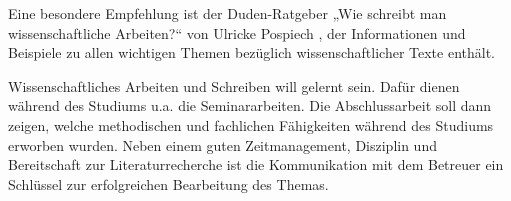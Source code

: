 \documentclass[
    12pt,
    headings=small,
    parskip=half,           %
    bibliography=totoc,
    numbers=noenddot,       %
    open=any,               %
    ]{scrreprt}
\begin{document}
Eine besondere Empfehlung ist der Duden-Ratgeber „Wie schreibt man wissenschaftliche Arbeiten?“ von Ulricke Pospiech \cite{Posp2012}, der Informationen und Beispiele zu allen wichtigen Themen bezüglich wissenschaftlicher Texte enthält.

Wissenschaftliches Arbeiten und Schreiben will gelernt sein. Dafür dienen während des Studiums u.a. die Seminararbeiten. Die Abschlussarbeit soll dann zeigen, welche methodischen und fachlichen Fähigkeiten während des Studiums erworben wurden. Neben einem guten Zeitmanagement, Disziplin und Bereitschaft zur Literaturrecherche ist die Kommunikation mit dem Betreuer ein Schlüssel zur erfolgreichen Bearbeitung des Themas.


\end{document}
